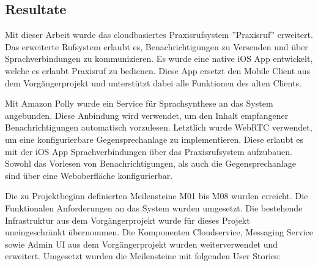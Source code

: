 \subsection{Resultate}

Mit dieser Arbeit wurde das cloudbasiertes Praxisrufsystem ''Praxisruf'' erweitert.
Das erweiterte Rufsystem erlaubt es, Benachrichtigungen zu Versenden und über Sprachverbindungen zu kommunizieren.
Es wurde eine native iOS App entwickelt, welche es erlaubt Praxisruf zu bedienen.
Diese App ersetzt den Mobile Client aus dem Vorgängerprojekt und unterstützt dabei alle Funktionen des alten Clients.

Mit Amazon Polly wurde ein Service für Sprachsynthese an das System angebunden.
Diese Anbindung wird verwendet, um den Inhalt empfangener Benachrichtigungen automatisch vorzulesen.
Letztlich wurde WebRTC verwendet, um eine konfigurierbare Gegensprechanlage zu implementieren.
Diese erlaubt es mit der iOS App Sprachverbindungen über das Praxisrufsystem aufzubauen.
Sowohl das Vorlesen von Benachrichtigungen, als auch die Gegensprechanlage sind über eine Weboberfläche konfigurierbar.

Die zu Projektbeginn definierten Meilensteine M01 bis M08 wurden erreicht.
Die Funktionalen Anforderungen an das System wurden umgesetzt.
Die bestehende Infrastruktur aus dem Vorgängerprojekt wurde für dieses Projekt uneingeschränkt übernommen.
Die Komponenten Cloudservice, Messaging Service sowie Admin UI aus dem Vorgängerprojekt wurden weiterverwendet und erweitert.
Umgesetzt wurden die Meilensteine mit folgenden User Stories:

